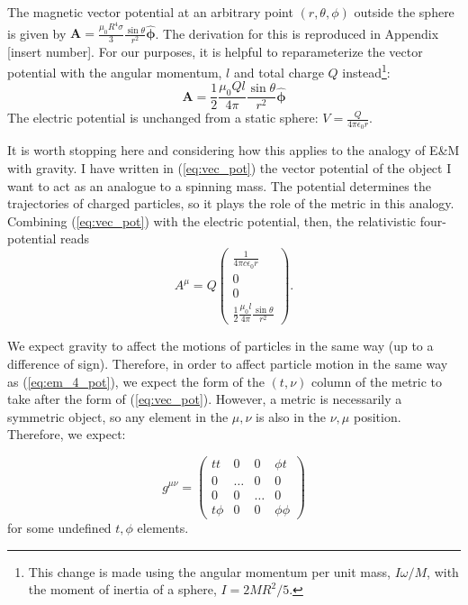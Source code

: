 \documentclass[11pt]{article}
\begin{document}
 The magnetic vector potential at an arbitrary point $(r,\theta,\phi)$ outside the sphere is given by $\mathbf{A} = \frac{\mu_0R^4\sigma}{3}\frac{\sin\theta}{r^2}\mathbf{\hat{\phi}}$.  The derivation for this is reproduced in Appendix [insert number].  For our purposes, it is helpful to reparameterize the vector potential with the angular momentum, $l$ and total charge $Q$ instead\footnote{This change is made using the angular momentum per unit mass, $I\omega/M$, with the moment of inertia of a sphere, $I = 2MR^2/5$.}:
 \begin{equation}\label{eq:vec_pot}
 \mathbf{A} = \frac{1}{2}\frac{\mu_0 Q l}{4\pi}\frac{\sin\theta}{r^2}\mathbf{\hat{\phi}}
 \end{equation}
The electric potential is unchanged from a static sphere: $V = \frac{Q}{4\pi\epsilon_0r}$.

It is worth stopping here and considering how this applies to the analogy of E\&M with gravity.  I have written in (\ref{eq:vec_pot}) the vector potential of the object I want to act as an analogue to a spinning mass.  The potential determines the trajectories of charged particles, so it plays the role of the metric in this analogy.  Combining (\ref{eq:vec_pot}) with the electric potential, then, the relativistic four-potential reads
\begin{equation}\label{eq:em_4_pot}
A^\mu = Q\left(
\begin{array}{c}
\frac{1}{4\pi c\epsilon_0r}\\
0\\
0\\
\frac{1}{2}\frac{\mu_0  l}{4\pi}\frac{\sin\theta}{r^2}
\end{array}
\right).
\end{equation}

We expect gravity to affect the motions of particles in the same way (up to a difference of sign).  Therefore, in order to affect particle motion in the same way as (\ref{eq:em_4_pot}), we expect the form of the $(t,\nu)$ column of the metric to take after the form of  (\ref{eq:vec_pot}).  However, a metric is necessarily a symmetric object, so any element in the $\mu,\nu$ is also in the $\nu,\mu$ position.  Therefore, we expect:

\begin{equation}\label{eq:rough_metric}
g^{\mu\nu} =
\left(
\begin{array}{cccc}
t t &0 &0 &\phi t\\
0 &\dots&0&0\\
0&0&\dots&0\\
t \phi&0&0&\phi\phi
\end{array}
\right)
\end{equation}
for some undefined $t,\phi$ elements.
\end{document}
